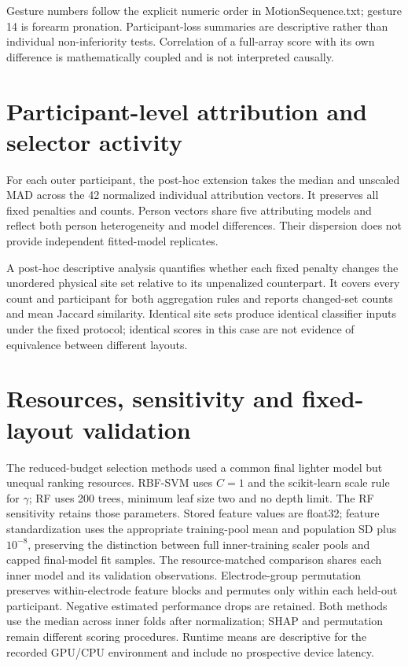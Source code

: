 \documentclass{iopjournal}
\begin{document}
Gesture numbers follow the explicit numeric order in MotionSequence.txt; gesture 14 is forearm pronation. Participant-loss summaries are descriptive rather than individual non-inferiority tests. Correlation of a full-array score with its own difference is mathematically coupled and is not interpreted causally.

\section{Participant-level attribution and selector activity}
For each outer participant, the post-hoc extension takes the median and unscaled MAD across the 42 normalized individual attribution vectors. It preserves all fixed penalties and counts. Person vectors share five attributing models and reflect both person heterogeneity and model differences. Their dispersion does not provide independent fitted-model replicates.

A post-hoc descriptive analysis quantifies whether each fixed penalty changes the unordered physical site set relative to its unpenalized counterpart. It covers every count and participant for both aggregation rules and reports changed-set counts and mean Jaccard similarity. Identical site sets produce identical classifier inputs under the fixed protocol; identical scores in this case are not evidence of equivalence between different layouts.

\section{Resources, sensitivity and fixed-layout validation}
The reduced-budget selection methods used a common final lighter model but unequal ranking resources. RBF-SVM uses $C=1$ and the scikit-learn scale rule for $\gamma$; RF uses 200 trees, minimum leaf size two and no depth limit. The RF sensitivity retains those parameters. Stored feature values are float32; feature standardization uses the appropriate training-pool mean and population SD plus $10^{-8}$, preserving the distinction between full inner-training scaler pools and capped final-model fit samples. The resource-matched comparison shares each inner model and its validation observations. Electrode-group permutation preserves within-electrode feature blocks and permutes only within each held-out participant. Negative estimated performance drops are retained. Both methods use the median across inner folds after normalization; SHAP and permutation remain different scoring procedures. Runtime means are descriptive for the recorded GPU/CPU environment and include no prospective device latency.
\end{document}
